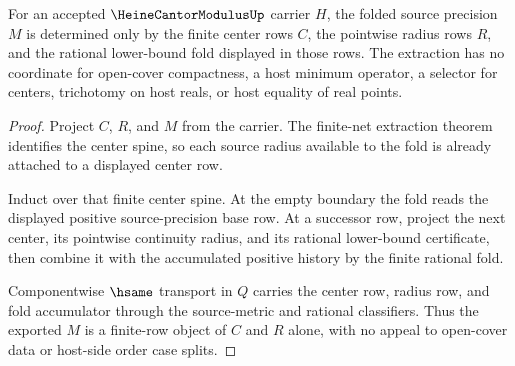 \begin{theorem}
\label{thm:heine-cantor-modulus-radius-fold}
For an accepted $\HeineCantorModulusUp$ carrier $H$, the folded source
precision $M$ is determined only by the finite center rows $C$, the pointwise
radius rows $R$, and the rational lower-bound fold displayed in those rows.
The extraction has no coordinate for open-cover compactness, a host minimum
operator, a selector for centers, trichotomy on host reals, or host equality of
real points.
\end{theorem}
\begin{proof}
Project $C$, $R$, and $M$ from the carrier. The finite-net extraction theorem
identifies the center spine, so each source radius available to the fold is
already attached to a displayed center row.

Induct over that finite center spine. At the empty boundary the fold reads the
displayed positive source-precision base row. At a successor row, project the
next center, its pointwise continuity radius, and its rational lower-bound
certificate, then combine it with the accumulated positive history by the
finite rational fold.

Componentwise $\hsame$ transport in $Q$ carries the center row, radius row, and
fold accumulator through the source-metric and rational classifiers. Thus the
exported $M$ is a finite-row object of $C$ and $R$ alone, with no appeal to
open-cover data or host-side order case splits.
\end{proof}

